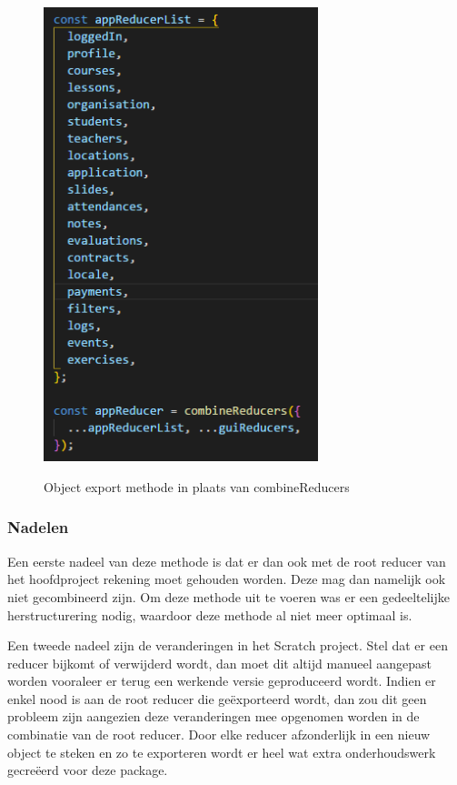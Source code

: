 \begin{figure}
	\begin{center}
		\caption{Object export methode in plaats van combineReducers}
		\includegraphics[width=8cm]{img/combineReducers-object-export}\\[0.5cm]
	\end{center}
\end{figure}
 
\subsubsection{Nadelen}
Een eerste nadeel van deze methode is dat er dan ook met de root reducer van het hoofdproject rekening moet gehouden worden. Deze mag dan namelijk ook niet gecombineerd zijn. Om deze methode uit te voeren was er een gedeeltelijke herstructurering nodig, waardoor deze methode al niet meer optimaal is. 

Een tweede nadeel zijn de veranderingen in het Scratch project. Stel dat er een reducer bijkomt of verwijderd wordt, dan moet dit altijd manueel aangepast worden vooraleer er terug een werkende versie geproduceerd wordt. Indien er enkel nood is aan de root reducer die geëxporteerd wordt, dan zou dit geen probleem zijn aangezien deze veranderingen mee opgenomen worden in de combinatie van de root reducer. Door elke reducer afzonderlijk in een nieuw object te steken en zo te exporteren wordt er heel wat extra onderhoudswerk gecreëerd voor deze package.  


